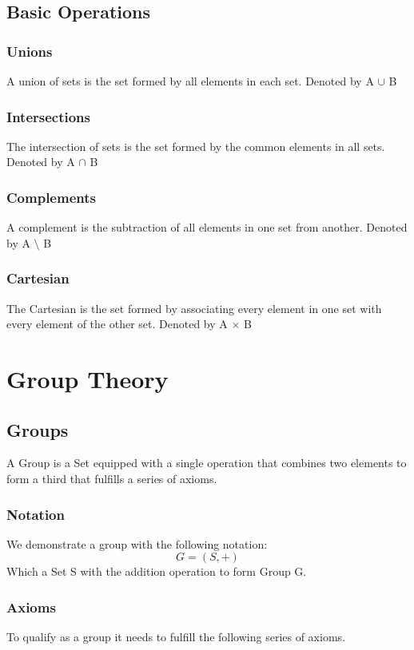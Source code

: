 \documentclass[10pt,a4paper]{report}
\begin{document}
\section{Basic Operations}
\subsection*{Unions}
A union of sets is the set formed by all elements in each set.
\newline Denoted by A $\cup$ B
\subsection*{Intersections}
The intersection of sets is the set formed by the common elements in all sets. 
\newline Denoted by A $\cap$ B
\subsection*{Complements}
A complement is the subtraction of all elements in one set from another.
\newline Denoted by A $\setminus$ B
\subsection*{Cartesian}	
The Cartesian is the set formed by associating every element in one set with every element of the other set.
\newline Denoted by A $\times$ B
\chapter{Group Theory}
\section{Groups}
A Group is a Set equipped with a single operation that combines two elements to form a third that fulfills a series of axioms.
\subsection*{Notation}
We demonstrate a group with the following notation:
\begin{equation}
	G = (S,+)
\end{equation}
Which a Set S with the addition operation to form Group G.

\subsection{Axioms}
To qualify as a group it needs to fulfill the following series of axioms.
\end{document}
